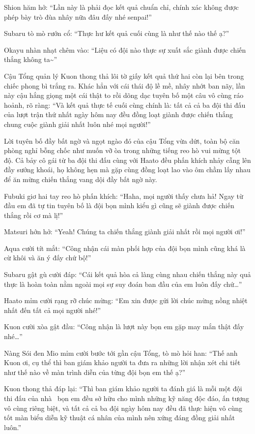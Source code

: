 \documentclass[../main.tex]{subfiles}
\begin{document}
Shion hăm hở: ``Lần này là phải đọc kết quả chuẩn chỉ, chính xác không được phép bày trò đùa nhây nữa đâu đấy nhé senpai!''

Subaru tò mò rướn cổ: ``Thực hư kết quả cuối cùng là như thế nào thế ạ?''

Okayu nhàn nhạt chêm vào: ``Liệu có đội nào thực sự xuất sắc giành được chiến thắng không ta\~{}''

Cậu Tổng quản lý Kuon thong thả lôi tờ giấy kết quả thứ hai còn lại bên trong chiếc phong bì trắng ra. Khác hẳn với cái thái độ lề mề, nhây nhớt ban nãy, lần này cậu hắng giọng một cái thật to rồi dõng dạc tuyên bố một câu vô cùng ráo hoảnh, rõ ràng: ``Và kết quả thực tế cuối cùng chính là: tất cả cả ba đội thi đấu của lượt trận thứ nhất ngày hôm nay đều đồng loạt giành được chiến thắng chung cuộc giành giải nhất luôn nhé mọi người!''

Lời tuyên bố đầy bất ngờ và ngọt ngào đó của cậu Tổng vừa dứt, toàn bộ căn phòng nghỉ bỗng chốc như muốn vỡ òa trong những tiếng reo hò vui mừng tột độ. Cả bảy cô gái từ ba đội thi đấu cùng với Haato đều phấn khích nhảy cẫng lên đầy sướng khoái, họ không hẹn mà gặp cùng đồng loạt lao vào ôm chầm lấy nhau để ăn mừng chiến thắng vang dội đầy bất ngờ này.

Fubuki giơ hai tay reo hò phấn khích: ``Haha, mọi người thấy chưa hả! Ngay từ đầu em đã tự tin tuyên bố là đội bọn mình kiểu gì cũng sẽ giành được chiến thắng rồi cơ mà lị!''

Matsuri hớn hở: ``Yeah! Chúng ta chiến thắng giành giải nhất rồi mọi người ơi!''

Aqua cười tít mắt: ``Công nhận cái màn phối hợp của đội bọn mình cũng khá là cừ khôi và ăn ý đấy chứ bộ!''

Subaru gật gù cười đáp: ``Cái kết quả hòa cả làng cùng nhau chiến thắng này quả thực là hoàn toàn nằm ngoài mọi sự suy đoán ban đầu của em luôn đấy chứ\dots''

Haato mỉm cười rạng rỡ chúc mừng: ``Em xin được gửi lời chúc mừng nồng nhiệt nhất đến tất cả mọi người nhé!''

Kuon cười xòa gật đầu: ``Công nhận là lượt này bọn em gặp may mắn thật đấy nhé\dots''

Nàng Sói đen Mio mỉm cười bước tới gần cậu Tổng, tò mò hỏi han: ``Thế anh Kuon ơi, cụ thể thì ban giám khảo người ta đưa ra những lời nhận xét chi tiết như thế nào về màn trình diễn của từng đội bọn em thế ạ?''

Kuon thong thả đáp lại: ``Thì ban giám khảo người ta đánh giá là mỗi một đội thi đấu của nhà \hll\ bọn em đều sở hữu cho mình những kỹ năng độc đáo, ấn tượng vô cùng riêng biệt, và tất cả cả ba đội ngày hôm nay đều đã thực hiện vô cùng tốt màn biểu diễn kỹ thuật cá nhân của mình nên xứng đáng đồng giải nhất luôn.''
\end{document}
